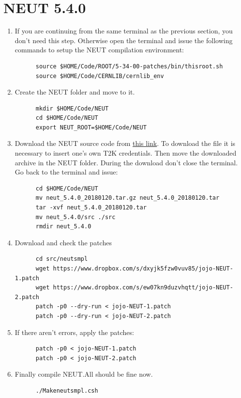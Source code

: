 \section{NEUT 5.4.0}
\begin{enumerate}[resume]
\item If you are continuing from the same terminal as the previous
  section, you don't need this step. Otherwise open the terminal and
  issue the following commands to setup the NEUT compilation
  environment:
\begin{lstlisting}
      source $HOME/Code/ROOT/5-34-00-patches/bin/thisroot.sh
      source $HOME/Code/CERNLIB/cernlib_env
\end{lstlisting}
\item Create the NEUT folder and move to it.
\begin{lstlisting}
      mkdir $HOME/Code/NEUT
      cd $HOME/Code/NEUT
      export NEUT_ROOT=$HOME/Code/NEUT
\end{lstlisting}
\item Download the NEUT source code from
  \href{https://www.t2k.org/asg/xsec/niwgdocs/neut/NEUT5.4.0}{this
    link}. To download the file it is necessary to insert one's own
  T2K credentials. Then move the downloaded archive in the NEUT
  folder. During the download don't close the terminal. Go back to the
  terminal and issue: 
\begin{lstlisting}
      cd $HOME/Code/NEUT
      mv neut_5.4.0_20180120.tar.gz neut_5.4.0_20180120.tar
      tar -xvf neut_5.4.0_20180120.tar
      mv neut_5.4.0/src ./src
      rmdir neut_5.4.0
\end{lstlisting}
\item Download and check the patches
\begin{lstlisting}
      cd src/neutsmpl
      wget https://www.dropbox.com/s/dxyjk5fzw0vuv85/jojo-NEUT-1.patch
      wget https://www.dropbox.com/s/ew07kn9duzvhqtt/jojo-NEUT-2.patch
      patch -p0 --dry-run < jojo-NEUT-1.patch
      patch -p0 --dry-run < jojo-NEUT-2.patch
\end{lstlisting}
\item If there aren't errors, apply the patches:
\begin{lstlisting}
      patch -p0 < jojo-NEUT-1.patch
      patch -p0 < jojo-NEUT-2.patch
\end{lstlisting}
\item Finally compile NEUT.\@ All should be fine now.
\begin{lstlisting}
      ./Makeneutsmpl.csh
\end{lstlisting}
\end{enumerate}

